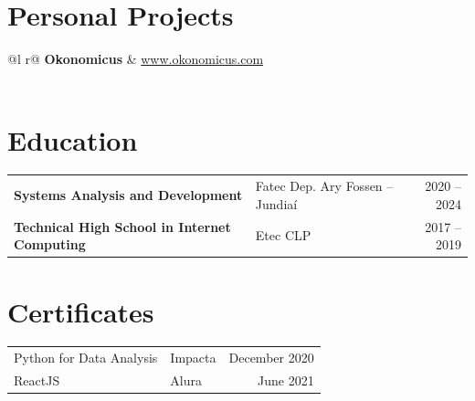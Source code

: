 \documentclass[a4paper,11pt]{article}
\begin{document}
\section{Personal Projects}

\begin{tabularx}{\linewidth}{ @{}l r@{} }
\textbf{\color{darkblue}Okonomicus} & \hfill \href{https://www.okonomicus.com}{\small www.okonomicus.com} \\[3pt]
  \\[8pt]

\end{tabularx}

\section{Education}

\begin{tabularx}{\linewidth}{@{}l X r@{}}
\textbf{Systems Analysis and Development} & \small Fatec Dep. Ary Fossen -- Jundiaí & 2020 -- 2024 \\[3pt]
\textbf{Technical High School in Internet Computing} & \small Etec CLP & 2017 -- 2019 \\
\end{tabularx}

\section{Certificates}

\begin{tabularx}{\linewidth}{@{}l X r@{}}
Python for Data Analysis & \small Impacta & December 2020 \\[3pt]
ReactJS & \small Alura & June 2021 \\
\end{tabularx}

\vfill
{}
\end{document}
